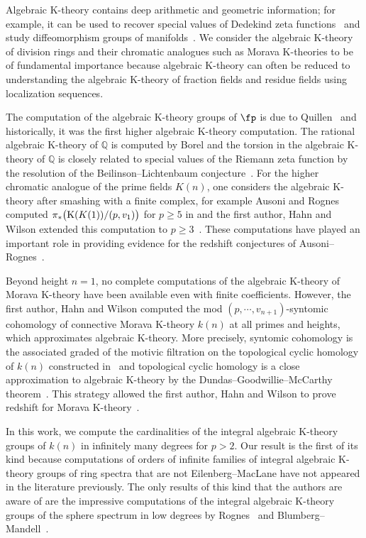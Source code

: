 \documentclass[english,10pt]{amsart}
\theoremstyle{definition}
\numberwithin{equation}{section}
\newcommand{\pis}{\pi_*}
\begin{document}
Algebraic K-theory contains deep arithmetic and geometric information; for example, it can be used to recover special values of Dedekind zeta functions~\cite{Lic73,Voe11} and study diffeomorphism groups of manifolds~\cite{WJR13}. We consider the algebraic K-theory of division rings and their chromatic analogues such as Morava K-theories to be of fundamental importance  because algebraic K-theory can often be reduced to understanding the algebraic K-theory of fraction fields and residue fields using localization sequences.

The computation of the algebraic K-theory groups of $\fp$ is due to Quillen~\cite{Qui72} and historically, it was the first higher algebraic K-theory computation. The rational algebraic K-theory of $\mathbb{Q}$ is computed by Borel  \cite{borel1972cohomologiereele,borel1974stablerealcohomologyofarithmeticgroups} and the torsion in the algebraic K-theory of $\mathbb{Q}$ is closely related to special values of the Riemann zeta function by the resolution of the Beilinson--Lichtenbaum conjecture~\cite{Voe11}. For the higher chromatic analogue of the prime fields $K(n)$, one considers the algebraic K-theory after smashing with a finite complex, for example Ausoni and Rognes computed $\pis \big(\textup{K}(K(1))/(p,v_1)\big)$ for $p \geq 5$ in \cite{ausoni2012kthrymoravaktheory} and the first author, Hahn and Wilson extended this computation to  $p\ge 3$~\cite{angelini2024syntomic}. These computations have played an important role in providing evidence for the redshift conjectures of Ausoni--Rognes~\cite{AR08}. 

Beyond height $n=1$, no complete computations of the algebraic K-theory of Morava K-theory have been available even with finite coefficients. However, the first author, Hahn and Wilson \cite{angelini2024syntomic} computed the mod $(p,\cdots,v_{n+1})$-syntomic cohomology of connective Morava K-theory $k(n)$ at all primes and heights, which approximates algebraic K-theory. More precisely, syntomic cohomology is the associated graded of the motivic filtration on the topological cyclic homology of $k(n)$ constructed in~\cite{hahn2022motivic} and topological cyclic homology is a close approximation to algebraic K-theory by the Dundas--Goodwillie--McCarthy theorem~\cite{DGM13}. 
This strategy allowed the first author, Hahn and Wilson to prove redshift for Morava K-theory~\cite{angelini2024syntomic}. 

In this work, we compute the cardinalities of the integral algebraic K-theory groups of $k(n)$ in infinitely many degrees for $p>2$. Our result is the first of its kind because computations of orders of infinite families of integral algebraic K-theory groups of ring spectra that are not Eilenberg--MacLane have not appeared in the literature previously. The only results of this kind that the authors are aware of are the impressive computations of the integral algebraic K-theory groups of the sphere spectrum in low degrees by Rognes~\cite{Rog03} and Blumberg--Mandell~\cite{BM19}. 
\end{document}
